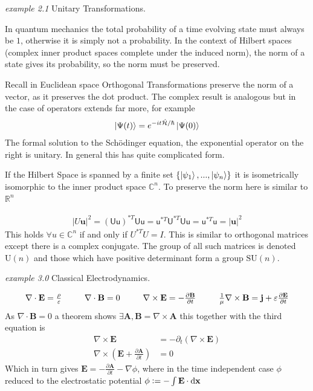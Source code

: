 \begin{flushleft}\textit{example 2.1} Unitary Transformations. \end{flushleft}
In quantum mechanics the total probability of a time evolving state must always be $1$, otherwise it is simply not a probability. In the context of Hilbert spaces (complex inner product spaces complete under the induced norm), the norm of a state gives its probability, so the norm must be preserved.

Recall in Euclidean space Orthogonal Transformations preserve the norm of a vector, as it preserves the dot product. The complex result is analogous but in the case of operators extends far more, for example
\begin{align*}
\ket{\Psi(t)}=e^{-it\hat{\mathcal{H}} / \hbar}\ket{\Psi(0)}
\end{align*}
The formal solution to the Sch\"odinger equation, the exponential operator on the right is unitary. In general this has quite complicated form. 

If the Hilbert Space is spanned by a finite set $\{\ket{\psi_1},...,\ket{\psi_n} \}$ it is isometrically isomorphic to the inner product space $\mathbb{C}^n$. To preserve the norm here is similar to $\mathbb{R}^n$

\begin{align*}
|U\mathbf{u}|^2 =(\mathsf{Uu})^{*T}\mathsf{Uu} = \mathsf{u}^{*T}\mathsf{U}^{*T}\mathsf{Uu} = \mathsf{u}^{*T}\mathsf{u} = |\mathbf{u}|^2
\end{align*}
This holds $\forall u \in \mathbb{C}^n$ if and only if  $U^{*T}U=I$. This is similar to orthogonal matrices except there is a complex conjugate. The group of all such matrices is denoted $\mathrm{U}(n)$ and those which have positive determinant form a group $\mathrm{SU}(n)$.

\begin{flushleft}\textit{example 3.0} Classical Electrodynamics. \end{flushleft}
\begin{align*}
\begin{array}{l l l l}
\nabla \cdot \mathbf{E} = \frac{\rho}{\varepsilon} \hspace{6mm}
&\nabla \cdot \mathbf{B} = 0\hspace{6mm}
& \nabla \times \mathbf{E} = -\frac{\partial \mathbf{B}}{\partial t} \hspace{6mm}
&\frac{1}{\mu}\nabla \times \mathbf{B} = \mathbf{j}+\varepsilon\frac{\partial \mathbf{E}}{\partial t}
\end{array}
\end{align*}
As $\nabla \cdot \mathbf{B} = 0$ a theorem shows $\exists \mathbf{A}, \mathbf{B}=\nabla \times \mathbf{A}$ this together with the third equation is
\begin{align*}
\nabla \times \mathbf{E} &= - \partial_t (\nabla \times \mathbf{E}) \\
\nabla \times (\mathbf{E}+\frac{\partial \mathbf{A}}{\partial t}) &=0
\end{align*}
Which in turn gives $\mathbf{E} = -\frac{\partial \mathbf{A}}{\partial t} - \nabla \phi$, where in the time independent case $\phi$ reduced to the electrostatic potential $\phi \vcentcolon = -\int \mathbf{E} \cdot \mathrm{d}\mathbf{x}$


